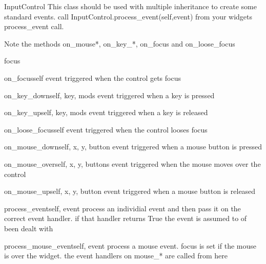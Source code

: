 \begin{classdesc*}{InputControl}
This class should be used with multiple inheritance to create
some standard events. call InputControl.process\_event(self,event)
from your widgets process\_event call.

Note the methods on\_mouse*, on\_key\_*, on\_focus and on\_loose\_focus

\begin{memberdesc}{focus}

\end{memberdesc}

\begin{methoddesc}{on_focus}{self}
event triggered when the control gets focus
\end{methoddesc}

\begin{methoddesc}{on_key_down}{self, key, mods}
event triggered when a key is pressed
\end{methoddesc}

\begin{methoddesc}{on_key_up}{self, key, mods}
event triggered when a key is released
\end{methoddesc}

\begin{methoddesc}{on_loose_focus}{self}
event triggered when the control looses focus
\end{methoddesc}

\begin{methoddesc}{on_mouse_down}{self, x, y, button}
event triggered when a mouse button is pressed
\end{methoddesc}

\begin{methoddesc}{on_mouse_over}{self, x, y, buttons}
event triggered when the mouse moves over the control
\end{methoddesc}

\begin{methoddesc}{on_mouse_up}{self, x, y, button}
event triggered when a mouse button is released
\end{methoddesc}

\begin{methoddesc}{process_event}{self, event}
process an individial event and then pass it on the correct event
handler. if that handler returns True the event is assumed to of been 
dealt with
\end{methoddesc}

\begin{methoddesc}{process_mouse_event}{self, event}
process a mouse event. focus is set if the mouse is over the widget.
the event handlers on mouse\_* are called from here
\end{methoddesc}

\end{classdesc*}

